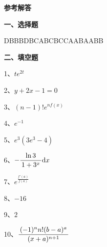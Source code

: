 \newpage

\begin{center}
	{\Large\bf 参考解答}
\end{center}

{\bf 一、选择题}

DBBBD\quad BCABC\quad BCCAA\quad BAABB

{\bf 二、填空题}

1、$te^{2t}$

2、$y+2x-1=0$

3、$(n-1)!e^{nf(x)}$

4、$e^{-1}$

5、$e^3(3e^3-4)$

6、$-\displaystyle\frac{\,{\ln3}\,}{\,{1+3^x}\,}\mathrm{d} x$

7、$e^{\frac{f'(a)}{f(a)}}$

8、$-16$

9、$2$

10、$\displaystyle\frac{\,{(-1)^nn!(b-a)^a}\,}{\,{(x+a)^{n+1}}\,}$